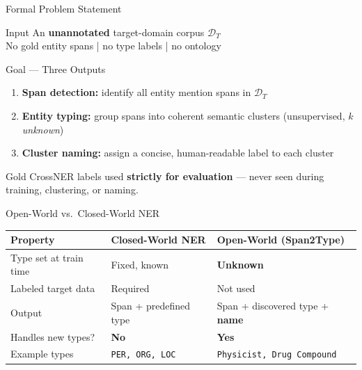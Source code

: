 \documentclass[aspectratio=169]{beamer}
\newcommand{\yes}{\textcolor{good}{\textbf{Yes}}}
\newcommand{\no}{\textcolor{bad}{\textbf{No}}}
\newcommand{\highlight}[1]{\textcolor{accent}{\textbf{#1}}}
\newcommand{\code}[1]{\texttt{\small #1}}
\begin{document}
\begin{frame}{Formal Problem Statement}
  \begin{block}{Input}
    An \textbf{unannotated} target-domain corpus $\mathcal{D}_T$\\
    No gold entity spans \;|\; no type labels \;|\; no ontology
  \end{block}
  \vspace{6pt}
  \begin{block}{Goal --- Three Outputs}
    \begin{enumerate}\setlength\itemsep{5pt}
      \item \textbf{Span detection:} identify all entity mention spans in $\mathcal{D}_T$
      \item \textbf{Entity typing:} group spans into coherent semantic clusters
        (unsupervised, $k$ \emph{unknown})
      \item \textbf{Cluster naming:} assign a concise, human-readable label
        to each cluster
    \end{enumerate}
  \end{block}
  \vspace{6pt}
  \begin{keybox}
    Gold CrossNER labels used \textbf{strictly for evaluation} ---
    never seen during training, clustering, or naming.
  \end{keybox}
\end{frame}

\begin{frame}{Open-World vs.\ Closed-World NER}
  \begin{center}
  \renewcommand{\arraystretch}{1.4}
  \begin{tabular}{p{3.2cm}|>{\centering\arraybackslash}p{3.2cm}|>{\centering\arraybackslash}p{3.6cm}}
    \toprule
    \rowcolor{primary!15}
    \textbf{Property}
      & \textbf{Closed-World NER}
      & \textbf{Open-World (Span2Type)} \\
    \midrule
    \rowcolor{rowA}
    Type set at train time & Fixed, known & \highlight{Unknown} \\
    \rowcolor{rowB}
    Labeled target data & Required & \textcolor{good}{Not used} \\
    \rowcolor{rowA}
    Output & Span + predefined type
            & Span + discovered type + \textbf{name} \\
    \rowcolor{rowB}
    Handles new types? & \no & \yes \\
    \rowcolor{rowA}
    Example types & \code{PER, ORG, LOC}
                  & \code{Physicist, Drug Compound} \\
    \bottomrule
  \end{tabular}
  \end{center}
\end{frame}
\end{document}

